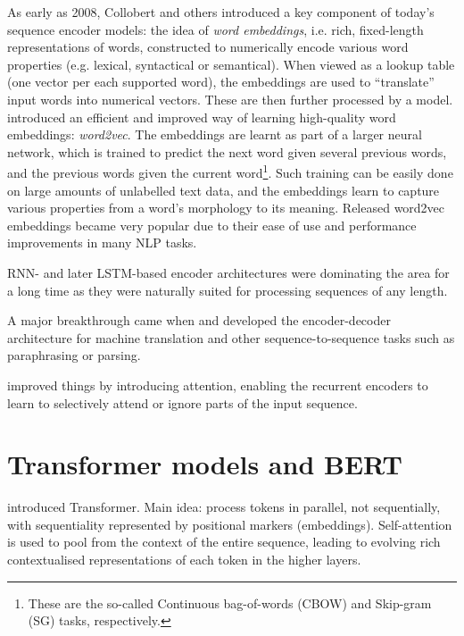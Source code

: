\documentclass[bsc,frontabs,twoside,singlespacing,parskip,deptreport]{infthesis}
\begin{document}
{{    %
    As early as 2008, Collobert and others \citep{Collobert_Weston_2008,Collobert_Weston_2011} introduced a key component of today's sequence encoder models: the idea of \textit{word embeddings}, i.e. rich, fixed-length representations of words, constructed to numerically encode various word properties (e.g. lexical, syntactical or semantical). When viewed as a lookup table (one vector per each supported word), the embeddings are used to ``translate'' input words into numerical vectors. These are then further processed by a model.
    \citet{Mikolov_2013} introduced an efficient and improved way of learning high-quality word embeddings: \textit{word2vec}. The embeddings are learnt as part of a larger neural network, which is trained to predict the next word given several previous words, and the previous words given the current word\footnote{These are the so-called Continuous bag-of-words (CBOW) and Skip-gram (SG) tasks, respectively.}. Such training can be easily done on large amounts of unlabelled text data, and the embeddings learn to capture various properties from a word's morphology to its meaning. Released word2vec embeddings became very popular due to their ease of use and performance improvements in many NLP tasks.

    RNN- and later LSTM-based encoder architectures were dominating the area for a long time as they were naturally suited for processing sequences of any length.

    A major breakthrough came when \citet{Kalchbrenner_2013} and \citet{Sutskever_2014} developed the encoder-decoder architecture for machine translation and other sequence-to-sequence tasks such as paraphrasing or parsing.

    \citet{Bahdanau_2014} improved things by introducing attention, enabling the recurrent encoders to learn to selectively attend or ignore parts of the input sequence.
  }

  \section{Transformer models and BERT}{
    \citet{Vaswani_2017} introduced Transformer. Main idea: process tokens in parallel, not sequentially, with sequentiality represented by positional markers (embeddings). Self-attention is used to pool from the context of the entire sequence, leading to evolving rich contextualised representations of each token in the higher layers.
    
}}
\end{document}
